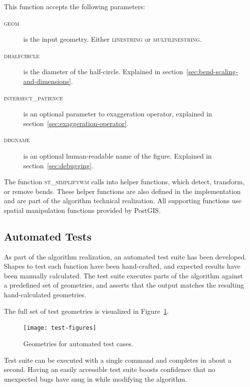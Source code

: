 \documentclass[a4paper]{article}
\begin{document}
This function accepts the following parameters:
\begin{description}

    \item[\normalfont\textsc{geom}] is the input geometry. Either
        \textsc{linestring} or \textsc{multilinestring}.

    \item[\normalfont\textsc{dhalfcircle}] is the diameter of the half-circle.
        Explained in section~\ref{sec:bend-scaling-and-dimensions}.

    \item[\normalfont\textsc{intersect\_patience}] is an optional parameter to
        exaggeration operator, explained in
        section~\ref{sec:exaggeration-operator}.

    \item[\normalfont\textsc{dbgname}] is an optional human-readable name of
        the figure. Explained in section~\ref{sec:debugging}.

\end{description}

The function \textsc{st\_simplifywm} calls into helper functions, which detect,
transform, or remove bends. These helper functions are also defined in the
implementation and are part of the algorithm technical realization. All
supporting functions use spatial manipulation functions provided by PostGIS.

\subsection{Automated Tests}
\label{sec:automated-tests}

As part of the algorithm realization, an automated test suite has been
developed. Shapes to test each function have been hand-crafted, and expected
results have been manually calculated. The test suite executes parts of the
algorithm against a predefined set of geometries, and asserts that the output
matches the resulting hand-calculated geometries.

The full set of test geometries is visualized in Figure~\ref{fig:test-figures}.

\begin{figure}[ht]
    \centering
    \texttt{[image: test-figures]}
    \caption{Geometries for automated test cases.}
    \label{fig:test-figures}
\end{figure}

Test suite can be executed with a single command and completes in about a
second. Having an easily accessible test suite boosts confidence that no
unexpected bugs have snug in while modifying the algorithm.
\end{document}
